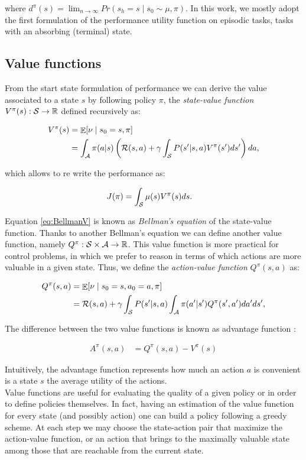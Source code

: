 where $d^{\pi}(s) = \lim_{n\to\infty} Pr(s_h=s\mid s_0\sim\mu,\pi)$. In this work, we mostly adopt the first formulation of the performance utility function on episodic tasks, \ie tasks with an absorbing (terminal) state.

\subsection{Value functions}
From the start state formulation of performance we can derive the value associated to a state $s$ by following  policy $\pi$, \ie the \emph{state-value function} $V^{\pi}(s):\mathcal{S}\to\mathbb{R}$ defined recursively as:

\begin{align}
V^{\pi}(s)
&=  \mathop{\mathbb{E}}[\nu\mid s_0=s,\pi]\\
&=  \int_{\mathcal{A}}\pi(a|s)\left(\mathcal{R}(s,a)+\gamma\int_{\mathcal{S}}P(s'|s, a)V^{\pi}(s')ds'\right)da \label{eq:BellmanV},
\end{align}

which allows to re write the performance as:

\begin{align}
J(\pi) &=  \int_{\mathcal{S}}\mu(s)V^{\pi}(s)ds.
\end{align}


Equation \ref{eq:BellmanV} is known as \emph{Bellman's equation} of the state-value function. Thanks to another Bellman's equation we can define another value function, namely $Q^{\pi}:\mathcal{S}\times\mathcal{A}\to\mathbb{R}$. This value function is more practical for control problems, in which we prefer to reason in terms of which actions are more valuable in a given state. Thus, we define the \emph{action-value function} $Q^{\pi}(s,a)$ as:

\begin{align}
Q^{\pi}(s,a)
&=  \mathop{\mathbb{E}}[\nu\mid s_0=s,a_0=a,\pi] \nonumber \\
&=  \mathcal{R}(s,a) + \gamma\int_{\mathcal{S}}P(s'|s, a)\int_{\mathcal{A}}\pi(a'|s')Q^{\pi}(s', a')da'ds' \label{eq:BellmanQ},
\end{align}

The difference between the two value functions is known as advantage function \cite{baird1993advantage}:

\begin{align}
A^{\pi}(s,a) &=  Q^{\pi}(s,a) - V^{\pi}(s)
\end{align}

Intuitively, the advantage function represents how much an action $a$ is convenient is a state $s$ \wrt the average utility of the actions. \\
Value functions are useful for evaluating the quality of a given policy or in order to define policies themselves. In fact, having an estimation of the value function for every state (and possibly action) one can build a policy following a greedy scheme. At each step we may choose the state-action pair that maximize the action-value function, or an action that brings to the maximally valuable state among those that are reachable from the current state.

